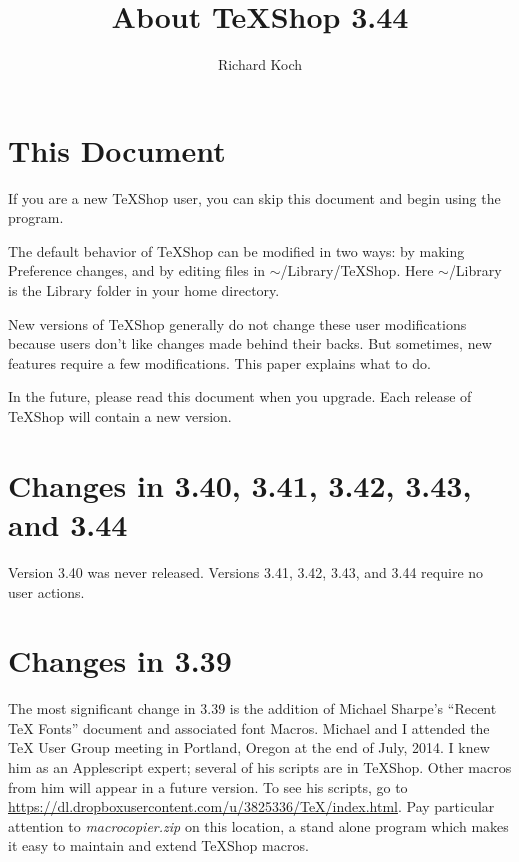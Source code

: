\documentclass[11pt, oneside]{amsart}
\title{About TeXShop 3.44}
\author{Richard Koch}
\begin{document}
\maketitle

\thispagestyle{empty}
\vspace{-.3in}
\section{This Document}

If you are a new TeXShop user, you can skip this document and begin using the program.

The default behavior of TeXShop can be modified in two ways: by making Preference changes, and by editing files in $\sim$/Library/TeXShop. Here $\sim$/Library is the Library folder in your home directory. 

New versions of TeXShop generally do not change these user modifications because users don't like changes made behind their backs. But sometimes, new features require a few modifications. This paper explains what to do.

In the future, please read this document when you upgrade. Each release of TeXShop will contain a new version.

\section{Changes in 3.40, 3.41,  3.42,  3.43, and 3.44}

Version 3.40 was never released. Versions 3.41, 3.42,  3.43, and 3.44 require no user actions.

\section{Changes in 3.39}

The most significant change in 3.39 is the addition of Michael Sharpe's ``Recent TeX Fonts'' document and associated font Macros.  Michael and I attended the TeX User Group meeting in Portland, Oregon at the end of July, 2014. I knew him as an Applescript expert; several of his scripts are in TeXShop. Other macros from him will appear in a future version. To see his scripts, go to 
\url{https://dl.dropboxusercontent.com/u/3825336/TeX/index.html}. Pay particular attention to 
{\em macrocopier.zip} on this location, a stand alone program which makes it easy to maintain and extend TeXShop macros.
\end{document}
